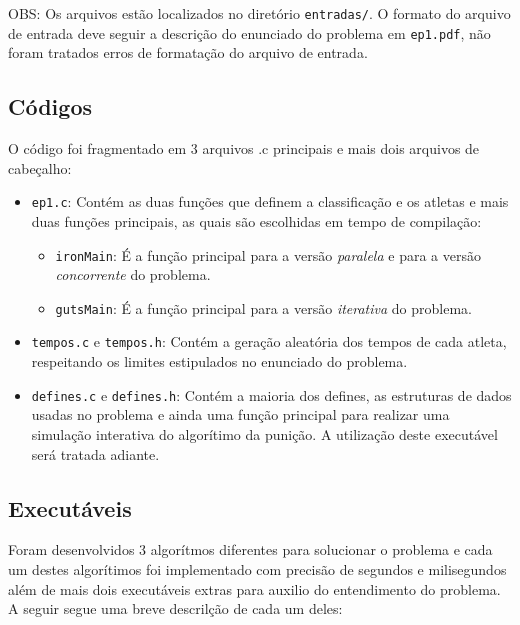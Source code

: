 \documentclass[12pt,a4paper]{article}
\begin{document}
OBS: Os arquivos estão localizados no diretório \verb+entradas/+. O formato do arquivo de entrada deve seguir a descrição do enunciado do problema em \verb+ep1.pdf+, não foram tratados erros de formatação do arquivo de entrada.

\subsection{Códigos}
O código foi fragmentado em 3 arquivos .c principais e mais dois arquivos de cabeçalho:

\begin{itemize}
\item \verb+ep1.c+: Contém as duas funções que definem a classificação e os atletas e mais duas funções principais, as quais são escolhidas em tempo de compilação:
\begin{itemize}
\item \verb+ironMain+: É a função principal para a versão \textit{paralela} e para a versão \textit{concorrente} do problema.
\item \verb+gutsMain+: É a função principal para a versão \textit{iterativa} do problema.
\end{itemize}
\item \verb+tempos.c+ e \verb+tempos.h+: Contém a geração aleatória dos tempos de cada atleta, respeitando os limites estipulados no enunciado do problema.
\item \verb+defines.c+ e \verb+defines.h+:  Contém a maioria dos defines, as estruturas de dados usadas no problema e ainda uma função principal para realizar uma simulação interativa do algorítimo da punição. A utilização deste executável será tratada adiante.
\end{itemize}

\subsection{Executáveis}

Foram desenvolvidos 3 algorítmos diferentes para solucionar o problema e cada um destes algorítimos foi implementado com precisão de segundos e milisegundos além de mais dois executáveis extras para auxilio do entendimento do problema. A seguir segue uma breve descrilção de cada um deles: 
\end{document}
